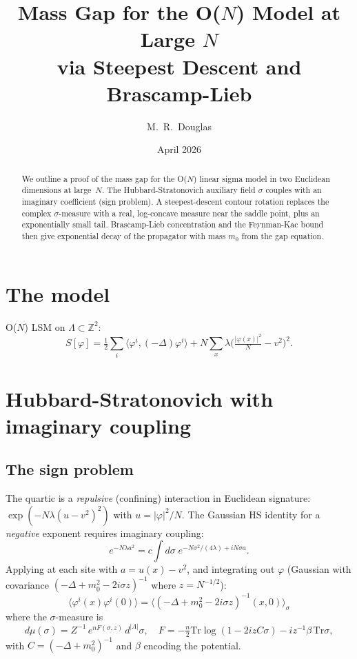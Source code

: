 \documentclass[12pt]{article}
\title{Mass Gap for the O($N$) Model at Large $N$\\
via Steepest Descent and Brascamp-Lieb}
\author{M.~R.~Douglas}
\date{April 2026}
\theoremstyle{definition}
\theoremstyle{remark}
\newcommand{\Z}{\mathbb{Z}}
\newcommand{\Tr}{\mathrm{Tr}}
\newcommand{\ph}{\varphi}
\newcommand{\La}{\Lambda}
\begin{document}
\maketitle

\begin{abstract}
We outline a proof of the mass gap for the O($N$) linear sigma model
in two Euclidean dimensions at large~$N$. The Hubbard-Stratonovich
auxiliary field $\sigma$ couples with an imaginary coefficient
(sign problem). A steepest-descent contour rotation replaces the
complex $\sigma$-measure with a real, log-concave measure near the
saddle point, plus an exponentially small tail. Brascamp-Lieb
concentration and the Feynman-Kac bound then give exponential decay
of the propagator with mass $m_0$ from the gap equation.
\end{abstract}

\tableofcontents

\section{The model}

O($N$) LSM on $\La \subset \Z^2$:
\begin{equation}
  S[\ph] = \tfrac{1}{2}\sum_i\langle\ph^i,(-\Delta)\ph^i\rangle
    + N\sum_x\lambda\bigl(\tfrac{|\ph(x)|^2}{N}-v^2\bigr)^2.
\end{equation}

\section{Hubbard-Stratonovich with imaginary coupling}

\subsection{The sign problem}

The quartic is a \emph{repulsive} (confining) interaction in
Euclidean signature: $\exp(-N\lambda(u-v^2)^2)$ with $u=|\ph|^2/N$.
The Gaussian HS identity for a \emph{negative} exponent requires
imaginary coupling:
\begin{equation}
\label{eq:HS}
  e^{-N\lambda a^2} = c\!\int\!d\sigma\;
    e^{-N\sigma^2/(4\lambda) + iN\sigma a}.
\end{equation}
Applying at each site with $a = u(x)-v^2$, and integrating out
$\ph$ (Gaussian with covariance $(-\Delta+m_0^2-2i\sigma z)^{-1}$
where $z = N^{-1/2}$):
\begin{equation}
\label{eq:phiprop}
  \langle\ph^i(x)\ph^i(0)\rangle
    = \bigl\langle(-\Delta+m_0^2-2i\sigma z)^{-1}(x,0)\bigr\rangle_\sigma
\end{equation}
where the $\sigma$-measure is
\begin{equation}
\label{eq:sigmameasure}
  d\mu(\sigma) = Z^{-1}\,e^{nF(\sigma,z)}\,d^{|\La|}\sigma,
  \quad
  F = -\tfrac{n}{2}\Tr\log(1-2izC\sigma) - iz^{-1}\beta\,\Tr\sigma,
\end{equation}
with $C = (-\Delta+m_0^2)^{-1}$ and $\beta$ encoding the potential.
\end{document}

